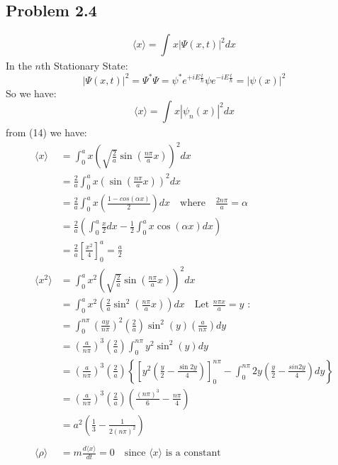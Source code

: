 \documentclass{article}
\begin{document}
\subsection*{Problem 2.4}
\begin{equation*}
    \langle x \rangle = \int_{}^{} x |\Psi(x,t)|^2 dx
\end{equation*}
In the \(n\)th Stationary State:
\[|\Psi(x,t)|^2 = \Psi^* \Psi = \psi^* e^{+iE\frac{t}{\hbar}}\psi e^{-iE\frac{t}{\hbar}} = |\psi(x)|^2\]
So we have:
\[\langle x \rangle = \int_{}^{}x|\psi_n(x)|^2dx\]
from (14) we have: 
\begingroup
\allowdisplaybreaks
\begin{align}
    \langle x \rangle &= \int_{0}^{a} x \left(\sqrt{\frac{2}{a}}\sin(\frac{n\pi}{a}x)\right)^2 dx \\
                      &= \frac{2}{a} \int_{0}^{a}x \left(\sin(\frac{n\pi}{a}x)\right)^2dx \\
                      &= \frac{2}{a} \int_{0}^{a}x \left( \frac{1-cos(\alpha x)}{2} \right) dx \quad \text{where} \quad \frac{2n\pi}{a} = \alpha \\
                      &= \frac{2}{a} \left(\int_{0}^{a} \frac{x}{2}dx - \frac{1}{2}\int_{0}^{a}x\cos(\alpha x)dx\right) \\
                      &= \frac{2}{a} \left[\frac{x^2}{4}\right]^a_0 = \frac{a}{2}\\
    \langle x^2 \rangle &= \int_{0}^{a} x^2 \left(\sqrt{\frac{2}{a}}\sin(\frac{n\pi}{a}x)\right)^2 dx \\
    &= \int_{0}^{a}x^2 \left(\frac{2}{a}\sin^2(\frac{n\pi}{a}x)\right)dx \quad \text{Let \(\frac{n\pi x}{a} = y \) :} \\
    &= \int_{0}^{n\pi} \left(\frac{ay}{n\pi}\right)^2\left(\frac{2}{a}\right) \sin^2(y)\left(\frac{a}{n\pi}\right)dy \\
    &= \left(\frac{a}{n\pi}\right)^3\left(\frac{2}{a}\right) \int_{0}^{n\pi} y^2 \sin^2(y)dy \\
    &= \left(\frac{a}{n\pi}\right)^3\left(\frac{2}{a}\right) \left\{ \left[y^2 \left(\frac{y}{2}-\frac{\sin2y}{4}\right)\right]^{n\pi}_0 - \int_{0}^{n\pi} 2y \left(\frac{y}{2}-\frac{sin2y}{4}\right)dy \right\} \\
    &= \left(\frac{a}{n\pi}\right)^3\left(\frac{2}{a}\right) \left(\frac{(n\pi)^3}{6}-\frac{n\pi}{4}\right) \\
    &= a^2 \left(\frac{1}{3}-\frac{1}{2(n\pi)^2}\right) \\
    \\
    \langle \rho \rangle &= m \frac{d\langle x \rangle}{dt} = 0 \quad \text{since } \langle x \rangle \text{ is a constant} \\

\end{align}
\end{document}
